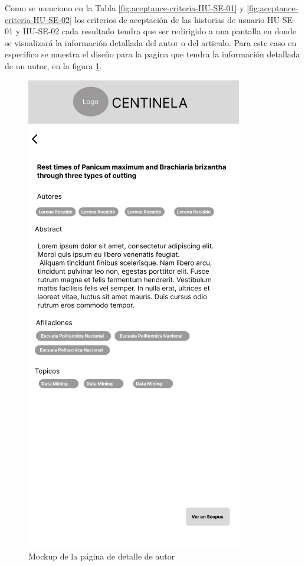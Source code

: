 Como se menciono en la Tabla \ref{fig:aceptance-criteria-HU-SE-01} y \ref{fig:aceptance-criteria-HU-SE-02} los criterios de aceptación de las historias de usuario HU-SE-01 y HU-SE-02 cada resultado tendra que ser redirigido a una pantalla en donde 
se visualizará la información detallada del autor o del articulo. Para este caso en especifico se muestra el diseño para la pagina que tendra
la información detallada de un autor, en la figura \ref{fig:mockup-article-detail}.
\begin{figure}[H]
    \centering
    \includegraphics[scale=0.8]{../02Figures/02Chapter/Sprints/Sprint-1/article-detail.png}
    \caption{Mockup de la página de detalle de autor}
    \label{fig:mockup-article-detail}
\end{figure}

